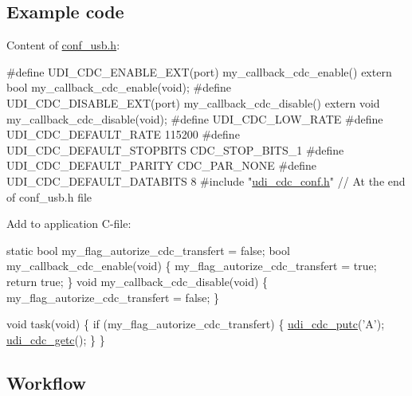 \hypertarget{udi_cdc_quickstart_udi_cdc_basic_use_case_usage_code}{}\subsection{Example code}\label{udi_cdc_quickstart_udi_cdc_basic_use_case_usage_code}
Content of \hyperlink{conf__usb_8h}{conf\-\_\-usb.\-h}\-: 
\begin{DoxyCode}
\textcolor{preprocessor}{         #define UDI\_CDC\_ENABLE\_EXT(port) my\_callback\_cdc\_enable()}
\textcolor{preprocessor}{}         \textcolor{keyword}{extern} \textcolor{keywordtype}{bool} my\_callback\_cdc\_enable(\textcolor{keywordtype}{void});
\textcolor{preprocessor}{         #define UDI\_CDC\_DISABLE\_EXT(port) my\_callback\_cdc\_disable()}
\textcolor{preprocessor}{}         \textcolor{keyword}{extern} \textcolor{keywordtype}{void} my\_callback\_cdc\_disable(\textcolor{keywordtype}{void});
\textcolor{preprocessor}{         #define  UDI\_CDC\_LOW\_RATE}
\textcolor{preprocessor}{}
\textcolor{preprocessor}{         #define  UDI\_CDC\_DEFAULT\_RATE             115200}
\textcolor{preprocessor}{}\textcolor{preprocessor}{         #define  UDI\_CDC\_DEFAULT\_STOPBITS         CDC\_STOP\_BITS\_1}
\textcolor{preprocessor}{}\textcolor{preprocessor}{         #define  UDI\_CDC\_DEFAULT\_PARITY           CDC\_PAR\_NONE}
\textcolor{preprocessor}{}\textcolor{preprocessor}{         #define  UDI\_CDC\_DEFAULT\_DATABITS         8}
\textcolor{preprocessor}{}
\textcolor{preprocessor}{         #include "\hyperlink{udi__cdc__conf_8h}{udi\_cdc\_conf.h}"} \textcolor{comment}{// At the end of conf\_usb.h
       file}
\end{DoxyCode}


Add to application C-\/file\-: 
\begin{DoxyCode}
         \textcolor{keyword}{static} \textcolor{keywordtype}{bool} my\_flag\_autorize\_cdc\_transfert = \textcolor{keyword}{false};
         \textcolor{keywordtype}{bool} my\_callback\_cdc\_enable(\textcolor{keywordtype}{void})
         \{
            my\_flag\_autorize\_cdc\_transfert = \textcolor{keyword}{true};
            \textcolor{keywordflow}{return} \textcolor{keyword}{true};
         \}
         \textcolor{keywordtype}{void} my\_callback\_cdc\_disable(\textcolor{keywordtype}{void})
         \{
            my\_flag\_autorize\_cdc\_transfert = \textcolor{keyword}{false};
         \}

         \textcolor{keywordtype}{void} task(\textcolor{keywordtype}{void})
         \{
            \textcolor{keywordflow}{if} (my\_flag\_autorize\_cdc\_transfert) \{
                \hyperlink{group__udi__cdc__group_ga8faae3fcf4911017c0fcf0aa127179f6}{udi\_cdc\_putc}(\textcolor{charliteral}{'A'});
                \hyperlink{group__udi__cdc__group_ga202f3fd7b153f6e1a41601735e0febb6}{udi\_cdc\_getc}();
            \}
         \}
\end{DoxyCode}
\hypertarget{udi_cdc_quickstart_udi_cdc_basic_use_case_setup_flow}{}\subsection{Workflow}\label{udi_cdc_quickstart_udi_cdc_basic_use_case_setup_flow}

